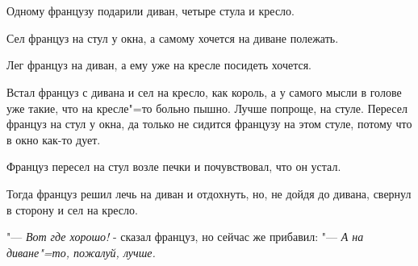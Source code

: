 \\\

Одному  французу подарили диван,  четыре стула и кресло.

Сел француз на стул у окна, а самому хочется на диване полежать.

Лег француз на диван, а ему уже на кресле посидеть хочется.
    
Встал француз с дивана и сел на кресло, как король, а у самого  мысли  в голове  уже такие, что на кресле"=то больно пышно.  Лучше попроще, на стуле. Пересел француз на стул у окна, да только не сидится французу на этом стуле, потому что в окно как-то дует.

Француз  пересел  на стул возле печки  и почувствовал, что он устал.

Тогда  француз решил лечь на диван и отдохнуть,  но, не дойдя до дивана,  свернул в сторону и сел на кресло.

"---  \textit{Вот где хорошо!}  - сказал француз, но сейчас же прибавил:  "--- \textit{А на диване"=то, пожалуй, лучше.}